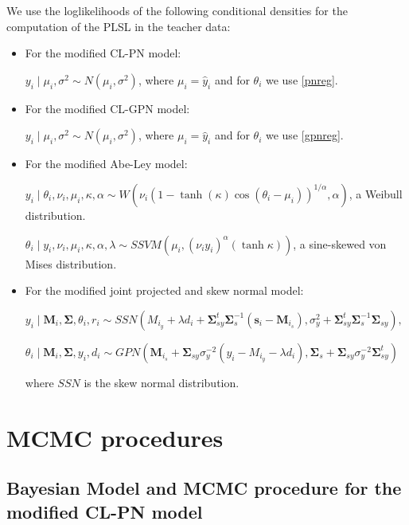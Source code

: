 \documentclass[12pt,]{article}
\begin{document}
\indent We use the loglikelihoods of the following conditional densities
for the computation of the PLSL in the teacher data:

\begin{itemize}
\item For the modified CL-PN model:

$y_i \mid \mu_i, \sigma^2 \sim N(\mu_i, \sigma^2)$, where $\mu_i = \hat{y}_i$ and for $\theta_i$ we use \eqref{pnreg}.

\item For the modified CL-GPN model:

$y_i \mid \mu_i, \sigma^2 \sim N(\mu_i, \sigma^2)$, where $\mu_i = \hat{y}_i$ and for $\theta_i$ we use \eqref{gpnreg}.

\item For the modified Abe-Ley model:

$y_i \mid \theta_i, \nu_i, \mu_i, \kappa, \alpha \sim W\left(\nu_i(1-\tanh(\kappa)\cos(\theta_i - \mu_i))^{1/\alpha}, \alpha\right)$, a Weibull distribution.

$\theta_i \mid y_i, \nu_i, \mu_i, \kappa, \alpha, \lambda \sim SSVM\left(\mu_i, (\nu_iy_i)^{\alpha}(\tanh{\kappa})\right)$, a sine-skewed von Mises distribution.

\item For the modified joint projected and skew normal model:

$y_i \mid \boldsymbol{M}_i, \boldsymbol{\Sigma}, \theta_i, r_i \sim SSN(M_{i_y} + \lambda d_i + \boldsymbol{\Sigma}_{sy}^t\boldsymbol{\Sigma}_s^{-1}(\boldsymbol{s}_i - \boldsymbol{M}_{i_s}), \sigma^2_y + \boldsymbol{\Sigma}_{sy}^t\boldsymbol{\Sigma}_s^{-1}\boldsymbol{\Sigma}_{sy}),$

$\theta_i \mid \boldsymbol{M}_i, \boldsymbol{\Sigma}, y_i, d_i \sim GPN(\boldsymbol{M}_{i_s} + \boldsymbol{\Sigma}_{sy}\sigma^{-2}_y(y_i - M_{i_y} - \lambda d_i), \boldsymbol{\Sigma}_s + \boldsymbol{\Sigma}_{sy}\sigma_y^{-2}\boldsymbol{\Sigma}_{sy}^t)$

where $SSN$ is the skew normal distribution.
\end{itemize}

\section{MCMC procedures}
\subsection{Bayesian Model and MCMC procedure for the modified CL-PN model}\label{A1}
\end{document}
